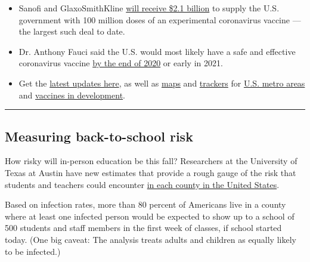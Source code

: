 \begin{itemize}
\item
  Sanofi and GlaxoSmithKline
  \href{https://www.nytimes3xbfgragh.onion/2020/07/31/health/covid-19-vaccine-sanofi-gsk.html}{will
  receive \$2.1 billion} to supply the U.S. government with 100 million
  doses of an experimental coronavirus vaccine --- the largest such deal
  to date.
\item
  Dr. Anthony Fauci said the U.S. would most likely have a safe and
  effective coronavirus vaccine
  \href{https://www.nytimes3xbfgragh.onion/2020/07/31/world/coronavirus-covid-19.html?action=click\&module=Top\%20Stories\&pgtype=Homepage\#link-4fab537}{by
  the end of 2020} or early in 2021.
\item
  Get the
  \href{https://www.nytimes3xbfgragh.onion/news-event/coronavirus}{latest
  updates here}, as well as
  \href{https://www.nytimes3xbfgragh.onion/interactive/2020/world/asia/china-wuhan-coronavirus-maps.html?action=click\&pgtype=Article\&state=default\&module=styln-coronavirus\&variant=show\&region=TOP_BANNER\&context=storyline_menu}{maps}
  and
  \href{https://www.nytimes3xbfgragh.onion/interactive/2020/04/03/upshot/coronavirus-metro-area-tracker.html}{trackers}
  for
  \href{https://www.nytimes3xbfgragh.onion/interactive/2020/04/03/upshot/coronavirus-metro-area-tracker.html}{U.S.
  metro areas} and
  \href{https://www.nytimes3xbfgragh.onion/interactive/2020/science/coronavirus-vaccine-tracker.html}{vaccines
  in development}.
\end{itemize}

\begin{center}\rule{0.5\linewidth}{\linethickness}\end{center}

\hypertarget{measuring-back-to-school-risk}{%
\subsection{Measuring back-to-school
risk}\label{measuring-back-to-school-risk}}

How risky will in-person education be this fall? Researchers at the
University of Texas at Austin have new estimates that provide a rough
gauge of the risk that students and teachers could encounter
\href{https://www.nytimes3xbfgragh.onion/interactive/2020/07/31/us/coronavirus-school-reopening-risk.html}{in
each county in the United States}.

Based on infection rates, more than 80 percent of Americans live in a
county where at least one infected person would be expected to show up
to a school of 500 students and staff members in the first week of
classes, if school started today. (One big caveat: The analysis treats
adults and children as equally likely to be infected.)

